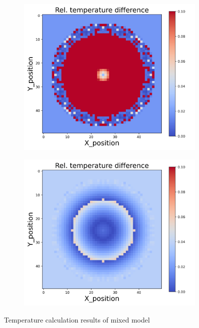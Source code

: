 \begin{figure}[h]
\begin{minipage}{\textwidth}
\begin{subfigure}{0.3\textwidth}
        \end{subfigure}
    \end{minipage}\\
    \begin{minipage}{\textwidth}
        \centering
        \begin{subfigure}{0.3\textwidth}
            \centering
            \includegraphics[width=\textwidth]{figures/raw_data/32/linear/T_bias.jpg}
        \end{subfigure}
        \begin{subfigure}{0.3\textwidth}
            \centering
            \includegraphics[width=\textwidth]{figures/raw_data/33/linear/T_bias.jpg}
        \end{subfigure}
    \end{minipage}
    \caption{Temperature calculation results of mixed model}  
\end{figure}

